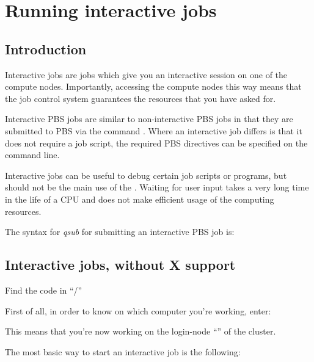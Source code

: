 \chapter{Running interactive jobs}
\label{ch:running-interactive-jobs}

\section{Introduction}

Interactive jobs are jobs which give you an interactive session on one of the
compute nodes. Importantly, accessing the compute nodes this way means that the
job control system guarantees the resources that you have asked for.

Interactive PBS jobs are similar to non-interactive PBS jobs in that they are
submitted to PBS via the command . Where an interactive job
differs is that it does not require a job script, the required PBS directives
can be specified on the command line.

Interactive jobs can be useful to debug certain job scripts or programs, but
should not be the main use of the \hpcInfra. Waiting for user input takes a
very long time in the life of a CPU and does not make efficient usage of the
computing resources.

The syntax for \emph{qsub} for submitting an interactive PBS job is:

\begin{prompt}
\end{prompt}

\section{Interactive jobs, without X support}

\begin{tip}
Find the code in
``\tilde/\exampledir''
\end{tip}

First of all, in order to know on which computer you're working, enter:

\begin{prompt}
\end{prompt}

This means that you're now working on the login-node ``\emph{\loginnode}'' of
the \hpc cluster.

The most basic way to start an interactive job is the following:

